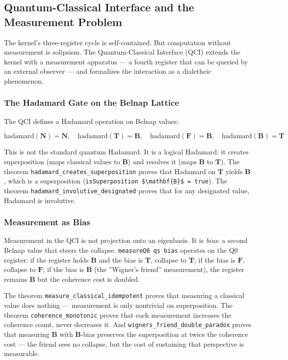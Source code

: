 \documentclass[10pt,a4paper]{article}
\begin{document}
\subsection{Quantum-Classical Interface and the Measurement Problem}

The kernel's three-register cycle is self-contained. But computation without measurement is solipsism. The Quantum-Classical Interface (QCI) extends the kernel with a measurement apparatus --- a fourth register that can be queried by an external observer --- and formalizes the interaction as a dialetheic phenomenon.

\subsubsection{The Hadamard Gate on the Belnap Lattice}

The QCI defines a Hadamard operation on Belnap values:

\[\text{hadamard}(\mathbf{N}) = \mathbf{N}, \quad \text{hadamard}(\mathbf{T}) = \mathbf{B}, \quad \text{hadamard}(\mathbf{F}) = \mathbf{B}, \quad \text{hadamard}(\mathbf{B}) = \mathbf{T}\]

This is not the standard quantum Hadamard. It is a logical Hadamard: it creates superposition (maps classical values to $\mathbf{B}$) and resolves it (maps $\mathbf{B}$ to $\mathbf{T}$). The theorem \texttt{hadamard\_\allowbreak creates\_\allowbreak superposition} proves that Hadamard on $\mathbf{T}$ yields $\mathbf{B}$, which is a superposition (\texttt{isSuperposition \$\textbackslash{}mathbf\{B\}\$ = true}). The theorem \texttt{hadamard\_\allowbreak involutive\_\allowbreak designated} proves that for any designated value, Hadamard is involutive.

\subsubsection{Measurement as Bias}

Measurement in the QCI is not projection onto an eigenbasis. It is \emph{bias}: a second Belnap value that steers the collapse. \texttt{measureQ0 qs bias} operates on the Q0 register: if the register holds $\mathbf{B}$ and the bias is $\mathbf{T}$, collapse to $\mathbf{T}$; if the bias is $\mathbf{F}$, collapse to $\mathbf{F}$; if the bias is $\mathbf{B}$ (the ''Wigner's friend'' measurement), the register remains $\mathbf{B}$ but the coherence cost is doubled.

The theorem \texttt{measure\_\allowbreak classical\_\allowbreak idempotent} proves that measuring a classical value does nothing --- measurement is only nontrivial on superposition. The theorem \texttt{coherence\_\allowbreak monotonic} proves that each measurement increases the coherence count, never decreases it. And \texttt{wigners\_\allowbreak friend\_\allowbreak double\_\allowbreak paradox} proves that measuring $\mathbf{B}$ with $\mathbf{B}$-bias preserves the superposition at twice the coherence cost --- the friend sees no collapse, but the cost of sustaining that perspective is measurable.
\end{document}
